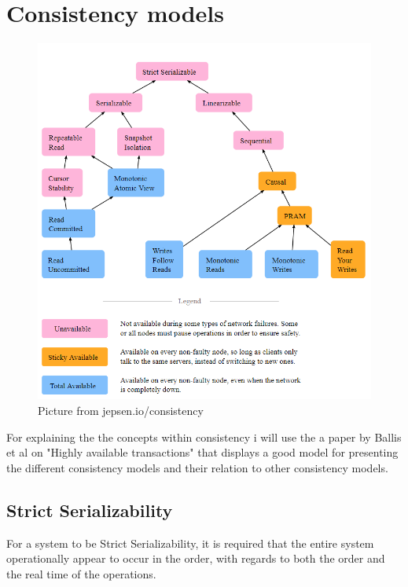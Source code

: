 \documentclass[a4paper,10pt,titlepage]{report}
\begin{document}
\newpage
\section{Consistency models}


\begin{figure}
    \centering
       \includegraphics[scale=0.4]{images/consistency models.PNG}
     \caption{Picture from jepsen.io/consistency}
     \label{fig:jepsenioconsistency}
\end{figure}


For explaining the the concepts within consistency i will use the a paper by Ballis et al on "Highly available transactions"\cite{10.14778/2732232.2732237} that displays a good model for presenting the different consistency models and their relation to other consistency models.\\


\subsection{Strict Serializability}

For a system to be Strict Serializability, it is required that the entire system operationally appear to occur in the order, with regards to both the order and the real time of the operations.\\
\vspace{5mm}
\end{document}
